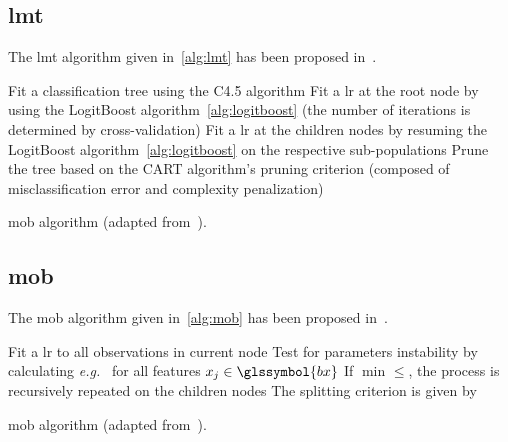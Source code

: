 \subsection{\gls{lmt}} \label{app1:sec_lmt}

The \gls{lmt} algorithm given in~\eqref{alg:lmt} has been proposed in~\cite{landwehr2005logistic}.

\begin{algorithm}[H]
 \KwResult{$ $}
 Fit a classification tree using the C4.5 algorithm\;
 Fit a \gls{lr} at the root node by using the LogitBoost algorithm~\ref{alg:logitboost} (the number of iterations is determined by cross-validation)\;
 Fit a \gls{lr} at the children nodes by resuming the LogitBoost algorithm~\ref{alg:logitboost} on the respective sub-populations\;
 Prune the tree based on the CART algorithm's pruning criterion (composed of misclassification error and complexity penalization)\;
 \caption{\label{alg:lmt} \gls{mob} algorithm (adapted from~\cite{landwehr2005logistic}).}
\end{algorithm}

\subsection{\gls{mob}} \label{app1:sec_mob}

The \gls{mob} algorithm given in~\eqref{alg:mob} has been proposed in~\cite{zeileis2008model}.

\begin{algorithm}[H]
 \KwResult{$ $}
 Fit a \gls{lr} to all observations in current node\;
 Test for parameters instability by calculating \textit{e.g.}\ $ $ for all features $x_j \in \glssymbol{bx}$\;
 If $\min_{} \leq  $, the process is recursively repeated on the children nodes\;
 The splitting criterion is given by \;
 \caption{\label{alg:mob} \gls{mob} algorithm (adapted from~\cite{zeileis2008model}).}
\end{algorithm}

\printbibliography[heading=subbibliography, title=References of Appendix A]

